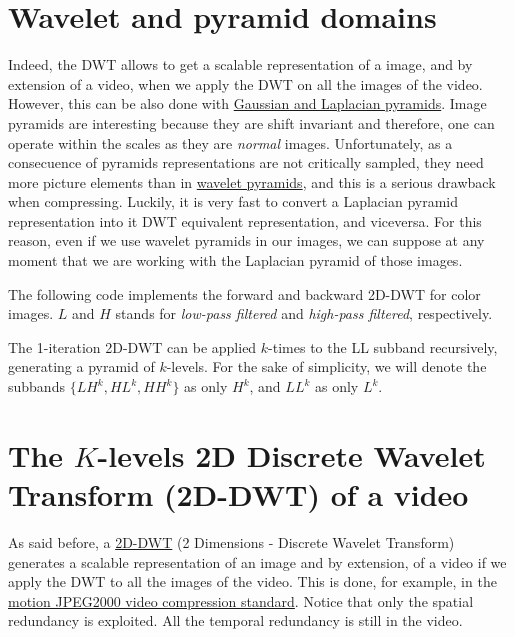 \section{Wavelet and pyramid domains}
Indeed, the DWT allows to get a scalable representation of a image, and
by extension of a video, when we apply the DWT on all the images of the
video. However, this can be also done with
\href{https://en.wikipedia.org/wiki/Pyramid_(image_processing)}{Gaussian
and Laplacian pyramids}. Image pyramids are interesting because they are
shift invariant and therefore, one can operate within the scales as they
are \emph{normal} images. Unfortunately, as a consecuence of pyramids
representations are not critically sampled, they need more picture
elements than in
\href{http://www.vtvt.ece.vt.edu/research/references/video/DCT_Video_Compression/Zhang92a.pdf}{wavelet
pyramids}, and this is a serious drawback when compressing. Luckily, it
is very fast to convert a Laplacian pyramid representation into it DWT
equivalent representation, and viceversa. For this reason, even if we
use wavelet pyramids in our images, we can suppose at any moment that we
are working with the Laplacian pyramid of those images.

The following code implements the forward and backward 2D-DWT for
color images. \(L\) and \(H\) stands for \emph{low-pass
  filtered} and \emph{high-pass filtered}, respectively.

The 1-iteration 2D-DWT can be applied $k$-times to the LL subband
recursively, generating a pyramid of $k$-levels. For the sake of
simplicity, we will denote the subbands \(\{LH^k, HL^k, HH^k\}\) as
only \(H^k\), and \(LL^k\) as only \(L^k\).





\section{The $K$-levels 2D Discrete Wavelet Transform (2D-DWT) of a
video}
As said before, a
\href{https://en.wikipedia.org/wiki/Discrete_wavelet_transform}{2D-DWT}
(2 Dimensions - Discrete Wavelet Transform) generates a scalable
representation of an image and by extension, of a video if we apply the
DWT to all the images of the video. This is done, for example, in the
\href{https://en.wikipedia.org/wiki/JPEG_2000}{motion JPEG2000 video
compression standard}. Notice that only the spatial redundancy is
exploited. All the temporal redundancy is still in the video.

